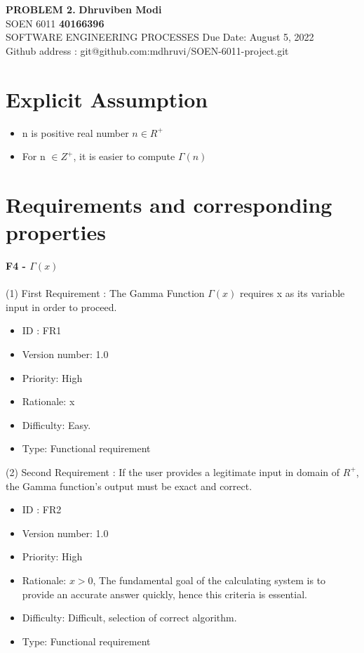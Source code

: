 \documentclass[a4paper, 11pt]{article}
\begin{document}
\noindent
\large\textbf{PROBLEM 2.} \hfill \textbf{Dhruviben Modi} \\
\normalsize SOEN 6011 \hfill \textbf{40166396} \\
 SOFTWARE ENGINEERING PROCESSES \hfill Due Date: August 5, 2022 \\
\hfill Github address : git@github.com:mdhruvi/SOEN-6011-project.git

\section{Explicit Assumption}
\begin{itemize}
     \item[1.]n is positive real number $n \in R^{+}$
     \item[2.]For n $\in Z^+$, it is easier to compute $\Gamma(n)$
\end{itemize}
\section{Requirements and corresponding properties}
\indent \textbf{F4 - $\Gamma \left( x \right)$} \\ \\
\indent (1) First Requirement : The Gamma Function $\Gamma(x)$ requires x as its variable input in order to proceed.

\begin{itemize}
    \item ID : FR1
    \item Version number: 1.0
    \item Priority: High
    \item Rationale: x
    \item Difficulty: Easy.
    \item Type: Functional requirement
\end{itemize}

(2) Second Requirement : If the user provides a legitimate input in domain of $R^+$, the Gamma function's output must be exact and correct.

\begin{itemize}
    \item ID : FR2
    \item Version number: 1.0
    \item Priority: High
    \item Rationale: $x > 0$, The fundamental goal of the calculating system is to provide an accurate answer quickly, hence this criteria is essential.
    \item Difficulty: Difficult, selection of correct algorithm.
    \item Type: Functional requirement
\end{itemize}
\end{document}
